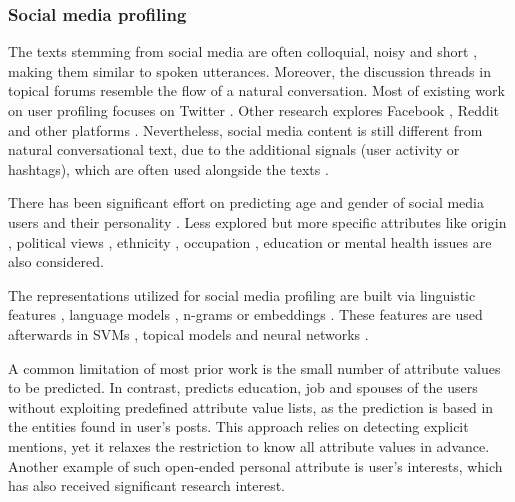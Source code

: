 \subsubsection{Social media profiling}

The texts stemming from social media are often colloquial, noisy and short \cite{bontcheva2014making}, making them similar to spoken utterances. Moreover, the discussion threads in topical forums resemble the flow of a natural conversation. Most of existing work on user profiling focuses on Twitter \cite{li2016persona, kim:ACL17:short, sap:EMNLP14, pietro:ACL15, pennacchiotti2011machine, kapanipathi2014user, rao2010classifying, Yen:2019:PKB:3331184.3331209}. Other research explores Facebook \cite{Markovikj2013MiningFD, sap:EMNLP14}, Reddit \cite{gjurkovic2018reddit} and other platforms \cite{zheng2019personalized}.
Nevertheless, social media content is still different from natural conversational text, due to the additional signals (user activity or hashtags), which are often used alongside the texts \cite{gjurkovic2018reddit, rao2010classifying}. 

There has been significant effort on predicting age and gender of social media users \cite{kim:ACL17:short, sap:EMNLP14, rao2010classifying, zheng2019personalized, li2019improving} and their personality \cite{Markovikj2013MiningFD, gjurkovic2018reddit}. Less explored but more specific attributes like origin \cite{rao2010classifying}, political views \cite{pennacchiotti2011machine, rao2010classifying}, ethnicity \cite{pennacchiotti2011machine}, occupation \cite{pietro:ACL15, li2014weakly}, education \cite{li2014weakly} or mental health issues \cite{shen2017detecting} are also considered. 

The representations utilized for social media profiling are built via linguistic features \cite{Markovikj2013MiningFD, gjurkovic2018reddit}, language models \cite{sap:EMNLP14}, n-grams \cite{rao2010classifying} or embeddings \cite{pietro:ACL15}. These features are used afterwards in SVMs \cite{gjurkovic2018reddit, rao2010classifying}, topical models \cite{pennacchiotti2011machine} and neural networks \cite{kim:ACL17:short, zheng2019personalized}.

A common limitation of most prior work is the small number of attribute values to be predicted. In contrast, \citet{li2014weakly} predicts education, job and spouses of the users without exploiting predefined attribute value lists, as the prediction is based in the entities found in user's posts. This approach relies on detecting explicit mentions, yet it relaxes the restriction to know all attribute values in advance. Another example of such open-ended personal attribute is user's interests, which has also received significant research interest.

